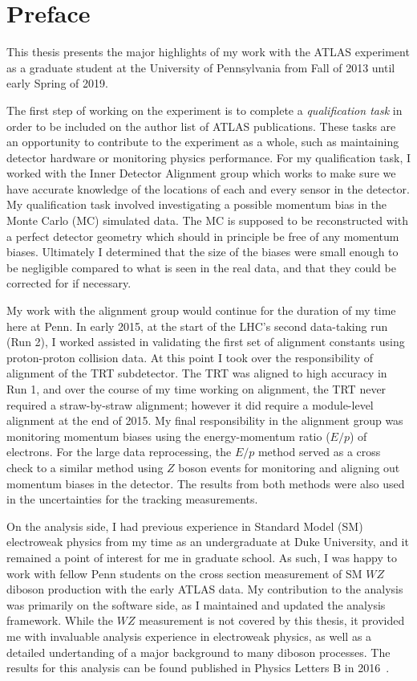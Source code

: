 \chapter{Preface}

This thesis presents the major highlights of my work with the ATLAS experiment as a graduate student at the University of Pennsylvania from Fall of 2013 until early Spring of 2019.

The first step of working on the experiment is to complete a \emph{qualification task} in order to be included on the author list of ATLAS publications.
These tasks are an opportunity to contribute to the experiment as a whole, such as maintaining detector hardware or monitoring physics performance.
For my qualification task, I worked with the Inner Detector Alignment group which works to make sure we have accurate knowledge of the locations of each and every sensor in the detector.
My qualification task involved investigating a possible momentum bias in the Monte Carlo (MC) simulated data.
The MC is supposed to be reconstructed with a perfect detector geometry which should in principle be free of any momentum biases.
Ultimately I determined that the size of the biases were small enough to be negligible compared to what is seen in the real data, and that they could be corrected for if necessary.

My work with the alignment group would continue for the duration of my time here at Penn.
In early 2015, at the start of the LHC's second data-taking run (Run 2), I worked assisted in validating the first set of alignment constants using  proton-proton collision data.
At this point I took over the responsibility of alignment of the TRT subdetector.
The TRT was aligned to high accuracy in Run 1, and over the course of my time working on alignment, the TRT never required a straw-by-straw alignment; however it did require a module-level alignment at the end of 2015.
My final responsibility in the alignment group was monitoring momentum biases using the energy-momentum ratio ($E/p$) of electrons.
For the large data reprocessing, the $E/p$ method served as a cross check to a similar method using $Z$ boson events for monitoring and aligning out momentum biases in the detector.
The results from both methods were also used in the uncertainties for the tracking measurements.

On the analysis side, I had previous experience in Standard Model (SM) electroweak physics from my time as an undergraduate at Duke University, and it remained a point of interest for me in graduate school.
As such, I was happy to work with fellow Penn students on the cross section measurement of SM $WZ$ diboson production with the early  ATLAS data.
My contribution to the analysis was primarily on the software side, as I maintained and updated the analysis framework.
While the $WZ$ measurement is not covered by this thesis, it provided me with invaluable analysis experience in electroweak physics, as well as a detailed undertanding of a major background to many diboson processes.
The results for this analysis can be found published in Physics Letters B in 2016~\cite{2016.wz-13tev-physlett}.

